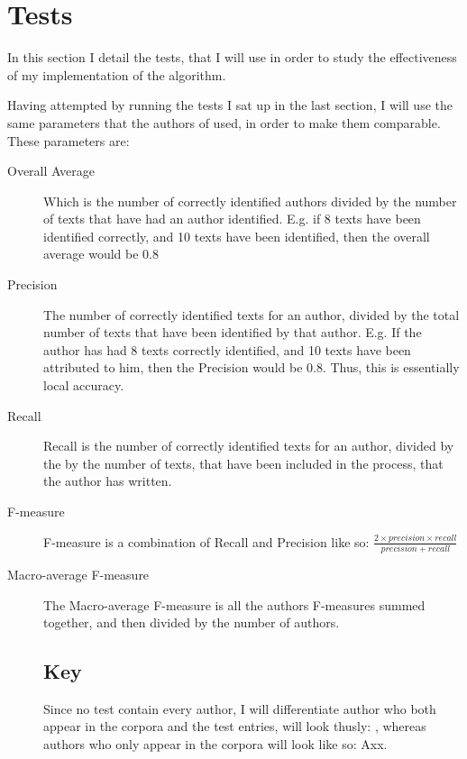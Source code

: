 \section{Tests}
\label{tests}

In this section I detail the tests, that I will use in order to study the effectiveness of my implementation of the algorithm.

Having attempted by running the tests I sat up in the last section, I will use the same parameters that the authors of \cite{nr4} used, in order to make them comparable. These parameters are: 

\begin{description}
\item[Overall Average] Which is the number of correctly identified authors divided by the number of texts that have had an author identified. E.g. if 8 texts have been identified correctly, and 10 texts have been identified, then the overall average would be 0.8 

\item[Precision] The number of correctly identified texts for an author, divided by the total number of texts that have been identified by that author. E.g. If the author has had 8 texts correctly identified, and 10 texts have been attributed to him, then the Precision would be 0.8. Thus, this is essentially local accuracy.

\item[Recall] Recall is the number of correctly identified texts for an author, divided by the by the number of texts, that have been included in the process, that the author has written.

\item[F-measure] F-measure is a combination of Recall and Precision like so: $\frac{2 \times precision \times recall}{precision+recall}$ 

\item[Macro-average F-measure] The Macro-average F-measure is all the authors F-measures summed together, and then divided by the number of authors. 

\subsection{Key}
Since no test contain every author, I will differentiate author who both appear in the corpora and the test entries, will look thusly: , whereas authors who only appear in the corpora will look like so: Axx.


\end{description}
